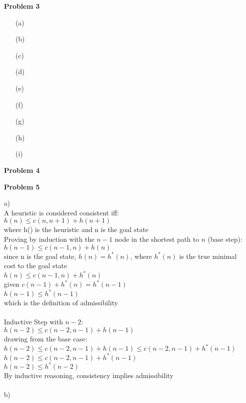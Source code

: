 \documentclass[11pt]{article}
\begin{document}
    \begin{center}
        \Large
        \textbf{Problem 3}
    \end{center}
    \normalsize
    \begin{enumerate}
        \item[(a)] %
        \item[(b)] %
        \item[(c)] %
        \item[(d)] %
        \item[(e)] %
        \item[(f)] %
        \item[(g)] %
        \item[(h)] %
        \item[(i)] %
    \end{enumerate}

    \begin{center}
        \Large
        \textbf{Problem 4}
    \end{center}
    \normalsize

    \begin{center}
        \Large
        \textbf{Problem 5}
    \end{center}
    \normalsize
    a)\\
    A heuristic is considered consistent iff:\\
        $h(n) \leq c(n,n+1) + h(n+1)$\\
        where h() is the heuristic and n is the goal state\\
        Proving by induction with the $n-1$ node in the shortest path to $n$ (base step):\\
        $h(n-1) \leq c(n-1,n) + h(n)$\\
        since n is the goal state, $h(n)=h^*(n)$, where $h^*(n)$ is the true minimal cost to the goal state\\
        $h(n) \leq c(n-1,n) + h^*(n)$\\
        given $c(n-1) + h^*(n) = h^*(n-1)$\\
        $h(n-1) \leq h^*(n-1)$\\
        which is the definition of admissibility\\\\
        Inductive Step with $n-2$:\\
        $h(n-2) \leq c(n-2,n-1) + h(n-1)$\\
        drawing from the base case:\\
        $h(n-2) \leq c(n-2,n-1) + h(n-1) \leq c(n-2,n-1) + h^*(n-1)$\\
        $h(n-2)\leq c(n-2,n-1) + h^*(n-1)$\\
        $h(n-2) \leq h^*(n-2)$\\
        By inductive reasoning, consistency implies admissibility\\\\
    b)\\
    
\end{document}
